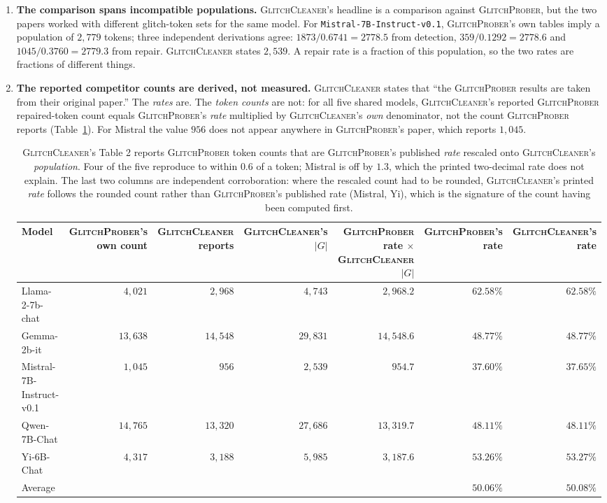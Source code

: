 \documentclass[11pt,a4paper]{article}
\newcommand{\gp}{\textsc{GlitchProber}}
\newcommand{\gc}{\textsc{GlitchCleaner}}
\begin{document}
\begin{enumerate}[leftmargin=*]

\item \textbf{The comparison spans incompatible populations.} \gc{}'s headline is a
comparison against \gp{}, but the two papers worked with different glitch-token
sets for the same model. For \texttt{Mistral-7B-Instruct-v0.1}, \gp{}'s own tables
imply a population of $2{,}779$ tokens; three independent derivations agree:
$1873/0.6741 = 2778.5$ from detection, $359/0.1292 = 2778.6$ and
$1045/0.3760 = 2779.3$ from repair. \gc{} states $2{,}539$. A repair rate is a
fraction of this population, so the two rates are fractions of different things.

\item \textbf{The reported competitor counts are derived, not measured.} \gc{}
states that ``the \gp{} results are taken from their original paper.'' The
\emph{rates} are. The \emph{token counts} are not: for all five shared models,
\gc{}'s reported \gp{} repaired-token count equals \gp{}'s \emph{rate} multiplied
by \gc{}'s \emph{own} denominator, not the count \gp{} reports
(Table~\ref{tab:rescale}). For Mistral the value $956$ does not appear anywhere in
\gp{}'s paper, which reports $1{,}045$.

\begin{table}[h]
\centering
\caption{\gc{}'s Table 2 reports \gp{} token counts that are \gp{}'s published
\emph{rate} rescaled onto \gc{}'s \emph{population}. Four of the five reproduce to
within $0.6$ of a token; Mistral is off by $1.3$, which the printed two-decimal
rate does not explain. The last two columns are independent corroboration: where
the rescaled count had to be rounded, \gc{}'s printed \emph{rate} follows the
rounded count rather than \gp{}'s published rate (Mistral, Yi), which is the
signature of the count having been computed first.}
\label{tab:rescale}
\small
\begin{tabular}{lrrrrrr}
\toprule
Model & \gp{}'s own count & \gc{} reports & \gc{}'s $|G|$ & \gp{} rate $\times$ \gc{} $|G|$ & \gp{}'s rate & \gc{}'s rate \\
\midrule
Llama-2-7b-chat          & $4{,}021$  & $2{,}968$  & $4{,}743$  & $2{,}968.2$  & $62.58\%$ & $62.58\%$ \\
Gemma-2b-it              & $13{,}638$ & $14{,}548$ & $29{,}831$ & $14{,}548.6$ & $48.77\%$ & $48.77\%$ \\
Mistral-7B-Instruct-v0.1 & $1{,}045$  & $956$      & $2{,}539$  & $954.7$      & $37.60\%$ & $\mathbf{37.65\%}$ \\
Qwen-7B-Chat             & $14{,}765$ & $13{,}320$ & $27{,}686$ & $13{,}319.7$ & $48.11\%$ & $48.11\%$ \\
Yi-6B-Chat               & $4{,}317$  & $3{,}188$  & $5{,}985$  & $3{,}187.6$  & $53.26\%$ & $\mathbf{53.27\%}$ \\
\midrule
Average                  &            &            &            &              & $50.06\%$ & $\mathbf{50.08\%}$ \\
\bottomrule
\end{tabular}
\end{table}


\end{enumerate}
\end{document}
